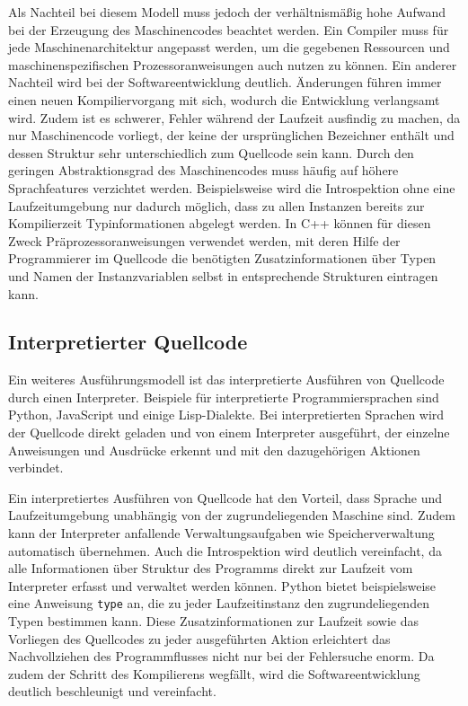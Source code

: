 \documentclass[11pt, parskip=half]{scrartcl}       %
\begin{document}
Als Nachteil bei diesem Modell muss jedoch der verhältnismäßig hohe Aufwand bei der Erzeugung des Maschinencodes beachtet werden.
Ein Compiler muss für jede Maschinenarchitektur angepasst werden, um die gegebenen Ressourcen und maschinenspezifischen Prozessoranweisungen auch nutzen zu können.
Ein anderer Nachteil wird bei der Softwareentwicklung deutlich.
Änderungen führen immer einen neuen Kompiliervorgang mit sich, wodurch die Entwicklung verlangsamt wird.
Zudem ist es schwerer, Fehler während der Laufzeit ausfindig zu machen, da nur Maschinencode vorliegt, der keine der ursprünglichen Bezeichner enthält und dessen Struktur sehr unterschiedlich zum Quellcode sein kann.
Durch den geringen Abstraktionsgrad des Maschinencodes muss häufig auf höhere Sprachfeatures verzichtet werden.\cite{quora_pros_and_cons_compiled_languages}
Beispielsweise wird die Introspektion ohne eine Laufzeitumgebung nur dadurch möglich, dass zu allen Instanzen bereits zur Kompilierzeit Typinformationen abgelegt werden.\cite{reflexive_programmiersprachen}
In C++ können für diesen Zweck Präprozessoranweisungen verwendet werden, mit deren Hilfe der Programmierer im Quellcode die benötigten Zusatzinformationen über Typen und Namen der Instanzvariablen selbst in entsprechende Strukturen eintragen kann.

\subsection{Interpretierter Quellcode}

Ein weiteres Ausführungsmodell ist das interpretierte Ausführen von Quellcode durch einen Interpreter.
Beispiele für interpretierte Programmiersprachen sind Python, JavaScript und einige Lisp-Dialekte.
Bei interpretierten Sprachen wird der Quellcode direkt geladen und von einem Interpreter ausgeführt, der einzelne Anweisungen und Ausdrücke erkennt und mit den dazugehörigen Aktionen verbindet.

Ein interpretiertes Ausführen von Quellcode hat den Vorteil, dass Sprache und Laufzeitumgebung unabhängig von der zugrundeliegenden Maschine sind.
Zudem kann der Interpreter anfallende Verwaltungsaufgaben wie Speicherverwaltung automatisch übernehmen.
Auch die Introspektion wird deutlich vereinfacht, da alle Informationen über Struktur des Programms direkt zur Laufzeit vom Interpreter erfasst und verwaltet werden können.
Python bietet beispielsweise eine Anweisung \texttt{type} an, die zu jeder Laufzeitinstanz den zugrundeliegenden Typen bestimmen kann.
Diese Zusatzinformationen zur Laufzeit sowie das Vorliegen des Quellcodes zu jeder ausgeführten Aktion erleichtert das Nachvollziehen des Programmflusses nicht nur bei der Fehlersuche enorm.
Da zudem der Schritt des Kompilierens wegfällt, wird die Softwareentwicklung deutlich beschleunigt und vereinfacht.
\end{document}
